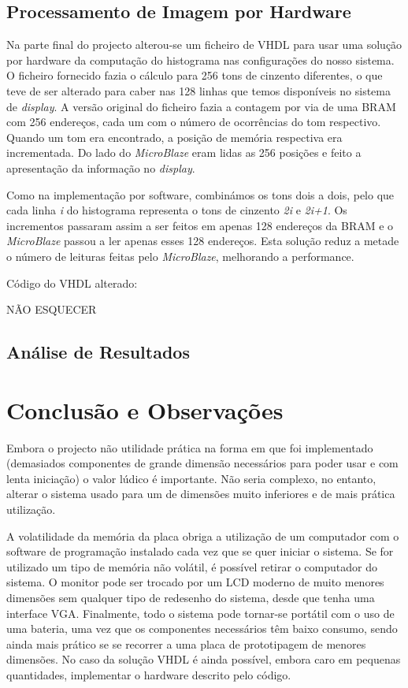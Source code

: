 \documentclass[a4paper,12pt]{article}
\begin{document}
\subsection{Processamento de Imagem por Hardware}
Na parte final do projecto alterou-se um ficheiro de VHDL para usar uma solução por hardware da computação do histograma nas configurações do nosso sistema. O ficheiro fornecido fazia o cálculo para 256 tons de cinzento diferentes, o que teve de ser alterado para caber nas 128 linhas que temos disponíveis no sistema de \textit{display}. A versão original do ficheiro fazia a contagem por via de uma BRAM com 256 endereços, cada um com o número de ocorrências do tom respectivo. Quando um tom era encontrado, a posição de memória respectiva era incrementada. Do lado do \textit{MicroBlaze} eram lidas as 256 posições e feito a apresentação da informação no \textit{display}. 

Como na implementação por software, combinámos os tons dois a dois, pelo que cada linha \textit{i} do histograma representa o tons de cinzento \textit{2i} e \textit{2i+1}. Os incrementos passaram assim a ser feitos em apenas 128 endereços da BRAM e o \textit{MicroBlaze} passou a ler apenas esses 128 endereços. Esta solução reduz a metade o número de leituras feitas pelo \textit{MicroBlaze}, melhorando a performance.

Código do VHDL alterado: 

NÃO ESQUECER 


\subsection{Análise de Resultados}

\section{Conclusão e Observações}
Embora o projecto não utilidade prática na forma em que foi implementado (demasiados componentes de grande dimensão necessários para poder usar e com lenta iniciação) o valor lúdico é importante. Não seria complexo, no entanto, alterar o sistema usado para um de dimensões muito inferiores e de mais prática utilização. 

A volatilidade da memória da placa obriga a utilização de um computador com o software de programação instalado cada vez que se quer iniciar o sistema. Se for utilizado um tipo de memória não volátil, é possível retirar o computador do sistema. O monitor pode ser trocado por um LCD moderno de muito menores dimensões sem qualquer tipo de redesenho do sistema, desde que tenha uma interface VGA. Finalmente, todo o sistema pode tornar-se portátil com o uso de uma bateria, uma vez que os componentes necessários têm baixo consumo, sendo ainda mais prático se se recorrer a uma placa de prototipagem de menores dimensões. No caso da solução VHDL é ainda possível, embora caro em pequenas quantidades, implementar o hardware descrito pelo código. 
\end{document}
